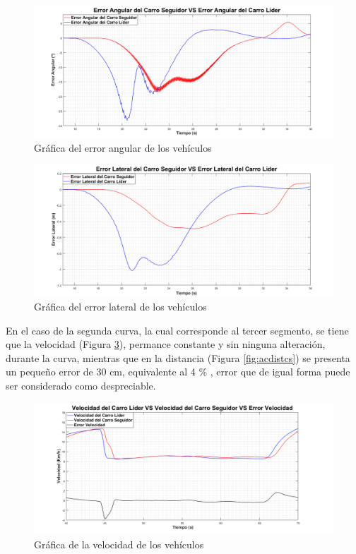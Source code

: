 \begin{figure}[H]
	\centering
		\includegraphics[scale=0.35]{Imagenes/acfea}
		\caption{Gráfica del error angular de los vehículos}
		\label{fig:acfea}
\end{figure}	

\begin{figure}[H]
	\centering
		\includegraphics[scale=0.35]{Imagenes/acfel}
		\caption{Gráfica del error lateral de los vehículos}
		\label{fig:acfel}
\end{figure}	


\par En el caso de la segunda curva, la cual corresponde al tercer segmento, se tiene que la velocidad (Figura \ref{fig:acvelcs}), permance constante y  sin ninguna alteración, durante la curva, mientras que en la distancia (Figura \ref{fig:acdistcs}) se presenta un pequeño error de 30 cm, equivalente al 4 \% , error que de igual forma puede ser considerado como despreciable.\\

\begin{figure}[H]
	\centering
		\includegraphics[scale=0.35]{Imagenes/vacs}
		\caption{Gráfica de la velocidad de los vehículos}
		\label{fig:acvelcs}
\end{figure}	

